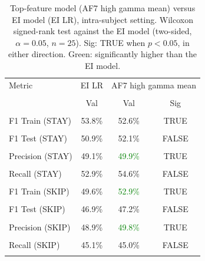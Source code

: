 \begin{table}[H]
\centering
\begin{tabular}{lccc}
\hline
Metric & EI LR & \multicolumn{2}{c}{AF7 high gamma mean} \\\\
 & Val & Val & Sig \\\\
\hline
F1 Train (STAY) & 53.8\% & 52.6\% & TRUE \\\\
F1 Test (STAY) & 50.9\% & 52.1\% & FALSE \\\\
Precision (STAY) & 49.1\% & \textcolor{green}{49.9\%} & TRUE \\\\
Recall (STAY) & 52.9\% & 54.6\% & FALSE \\\\
F1 Train (SKIP) & 49.6\% & \textcolor{green}{52.9\%} & TRUE \\\\
F1 Test (SKIP) & 46.9\% & 47.2\% & FALSE \\\\
Precision (SKIP) & 48.9\% & \textcolor{green}{49.8\%} & TRUE \\\\
Recall (SKIP) & 45.1\% & 45.0\% & FALSE \\\\
\hline
\end{tabular}
\caption{Top-feature model (AF7 high gamma mean) versus EI model (EI LR), intra-subject setting. Wilcoxon signed-rank test against the EI model (two-sided, $\alpha=0.05$, $n=25$). Sig: TRUE when $p<0.05$, in either direction. Green: significantly higher than the EI model.}
\label{tab:metrics_5_intra_1}
\end{table}
